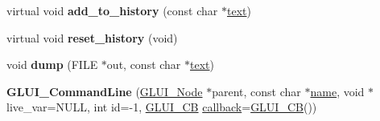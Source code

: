 \begin{DoxyCompactItemize}
\item 
\hypertarget{class_g_l_u_i___command_line_afe7219786a93c8b0ba98bb5d7d777a54}{virtual void {\bfseries add\+\_\+to\+\_\+history} (const char $\ast$\hyperlink{class_g_l_u_i___control_af0d60e9736f4dbc34e9a536e75876d72}{text})}\label{class_g_l_u_i___command_line_afe7219786a93c8b0ba98bb5d7d777a54}

\item 
\hypertarget{class_g_l_u_i___command_line_a837acdd1006a5f8179c0faa0cb07045b}{virtual void {\bfseries reset\+\_\+history} (void)}\label{class_g_l_u_i___command_line_a837acdd1006a5f8179c0faa0cb07045b}

\item 
\hypertarget{class_g_l_u_i___command_line_a89815aca68b849830ba26253135efaf5}{void {\bfseries dump} (F\+I\+L\+E $\ast$out, const char $\ast$\hyperlink{class_g_l_u_i___control_af0d60e9736f4dbc34e9a536e75876d72}{text})}\label{class_g_l_u_i___command_line_a89815aca68b849830ba26253135efaf5}

\item 
\hypertarget{class_g_l_u_i___command_line_a1367881039ac1384af53f71fa35932b3}{{\bfseries G\+L\+U\+I\+\_\+\+Command\+Line} (\hyperlink{class_g_l_u_i___node}{G\+L\+U\+I\+\_\+\+Node} $\ast$parent, const char $\ast$\hyperlink{class_g_l_u_i___control_aa95b97d50df45335fc33f0af03958eb3}{name}, void $\ast$live\+\_\+var=N\+U\+L\+L, int id=-\/1, \hyperlink{class_g_l_u_i___c_b}{G\+L\+U\+I\+\_\+\+C\+B} \hyperlink{class_g_l_u_i___control_a96060fe0cc6d537e736dd6eef78e24ab}{callback}=\hyperlink{class_g_l_u_i___c_b}{G\+L\+U\+I\+\_\+\+C\+B}())}\label{class_g_l_u_i___command_line_a1367881039ac1384af53f71fa35932b3}

\end{DoxyCompactItemize}
